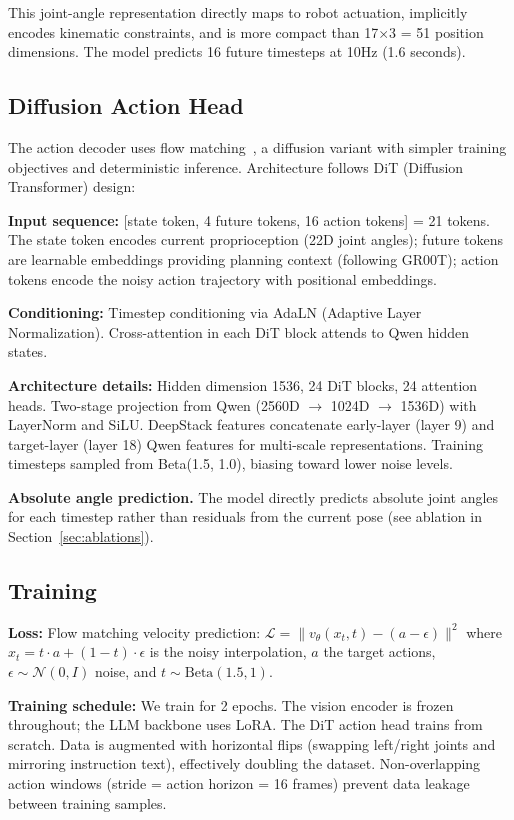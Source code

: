 \documentclass[letterpaper, 10pt, conference]{ieeeconf}
\begin{document}
This joint-angle representation directly maps to robot actuation, implicitly encodes kinematic constraints, and is more compact than 17$\times$3 = 51 position dimensions. The model predicts 16 future timesteps at 10Hz (1.6 seconds).

\subsection{Diffusion Action Head}

The action decoder uses flow matching~\cite{flowmatching}, a diffusion variant with simpler training objectives and deterministic inference. Architecture follows DiT (Diffusion Transformer) design:

\textbf{Input sequence:} [state token, 4 future tokens, 16 action tokens] = 21 tokens. The state token encodes current proprioception (22D joint angles); future tokens are learnable embeddings providing planning context (following GR00T); action tokens encode the noisy action trajectory with positional embeddings.

\textbf{Conditioning:} Timestep conditioning via AdaLN (Adaptive Layer Normalization). Cross-attention in each DiT block attends to Qwen hidden states.

\textbf{Architecture details:} Hidden dimension 1536, 24 DiT blocks, 24 attention heads. Two-stage projection from Qwen (2560D $\to$ 1024D $\to$ 1536D) with LayerNorm and SiLU. DeepStack features concatenate early-layer (layer 9) and target-layer (layer 18) Qwen features for multi-scale representations. Training timesteps sampled from Beta(1.5, 1.0), biasing toward lower noise levels.

\textbf{Absolute angle prediction.} The model directly predicts absolute joint angles for each timestep rather than residuals from the current pose (see ablation in Section~\ref{sec:ablations}).

\subsection{Training}
\label{sec:training_compute}

\textbf{Loss:} Flow matching velocity prediction: $\mathcal{L} = \|v_\theta(x_t, t) - (a - \epsilon)\|^2$ where $x_t = t \cdot a + (1-t) \cdot \epsilon$ is the noisy interpolation, $a$ the target actions, $\epsilon \sim \mathcal{N}(0, I)$ noise, and $t \sim \text{Beta}(1.5, 1)$.

\textbf{Training schedule:} We train for 2 epochs. The vision encoder is frozen throughout; the LLM backbone uses LoRA. The DiT action head trains from scratch. Data is augmented with horizontal flips (swapping left/right joints and mirroring instruction text), effectively doubling the dataset. Non-overlapping action windows (stride = action horizon = 16 frames) prevent data leakage between training samples.
\end{document}
